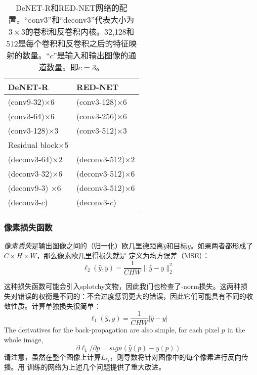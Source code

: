 \begin{table}
\vspace{-4mm}
\centering
\caption[DeNET-R和RED-NET网络的配置参数表]{DeNET-R和RED-NET网络的配置。“conv3”和“deconv3”代表大小为$ 3 \times3 $的卷积和反卷积内核。32,128和512是每个卷积和反卷积之后的特征映射的数量。“$ c $”是输入和输出图像的通道数量。即$ c = 3 $。}
\begin{tabular}{l | l }\hline
DeNET-R                   &RED-NET                \\ \hline
(conv9-32)$\times$6             &(conv3-128)$\times$6       \\ \hline
(conv3-64)$\times$6             &(conv3-256)$\times$6       \\ \hline
(conv3-128)$\times$3             &(conv3-512)$\times$3       \\ \hline
Residual block$\times$5 &                           \\ \hline
(deconv3-64)$\times$2           &(deconv3-512)$\times$2       \\ \hline
(deconv3-32)$\times$6           &(deconv3-512)$\times$6       \\ \hline
(deconv9-3) $\times$6           &(deconv3-512)$\times$6       \\ \hline
(deconv3-$c$)           &(deconv3-$c$)                \\ \hline
\end{tabular}
\label{table1}
\end{table}
\subsubsection{像素损失函数}
\emph{像素丢失}是输出图像之间的（归一化）欧几里德距离$ \hat y $和目标$ y $。如果两者都形成了$ C \times H \times W $，那么像素欧几里得损失就是
定义为均方误差（MSE）：
 \begin{equation}
   \ell_2(\hat y, y) = \frac{1}{CHW}\|\hat y - y\|_2^2
  \end{equation}


这种损失函数可能会引入splotchy文物，因此我们也检查了\lone-norm损失。这两种损失对错误的权衡是不同的：\lone 不会过度惩罚更大的错误，因此它们可能具有不同的收敛性质。计算单独损失很简单：
\begin{equation}
\ell_1(\hat y, y) = \frac{1}{CHW}| \hat y - y|
\end{equation}
The derivatives for the back-propagation are also simple,  for each pixel $p$ in the whole image,
\begin{equation}
\partial \ell_1/\partial p  = sign\left(\hat y(p) - y(p)\right)
\end{equation}
请注意，虽然在整个图像上计算$ L_{\ell_1} $，则导数将针对图像中的每个像素进行反向传播。用 训练的网络为上述几个问题提供了重大改进。

